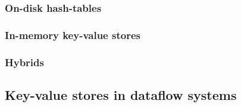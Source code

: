 \subsubsection{On-disk hash-tables}


\subsubsection{In-memory key-value stores}


\subsubsection{Hybrids}


\subsection{Key-value stores in dataflow systems}

